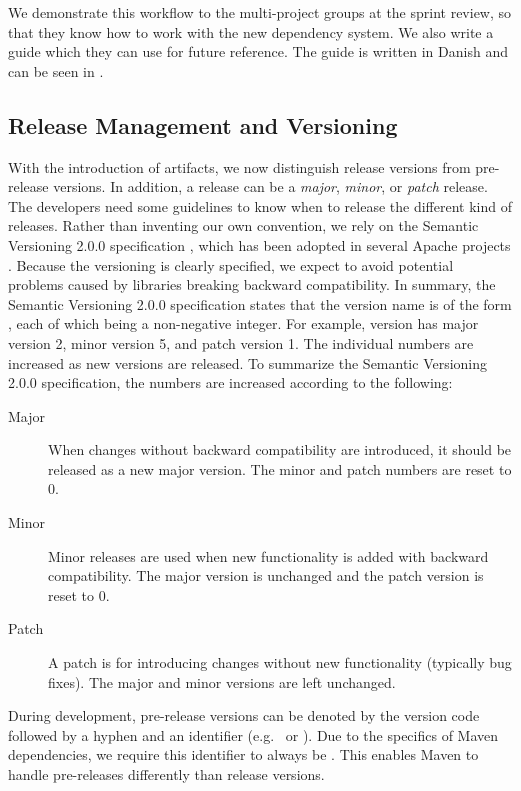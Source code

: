 We demonstrate this workflow to the multi-project groups at the sprint review, so that they know how to work with the new dependency system. We also write a guide which they can use for future reference. The guide is written in Danish and can be seen in .

\subsection{Release Management and Versioning}\label{subsec:release-management}
With the introduction of artifacts, we now distinguish release versions from pre-release versions. In addition, a release can be a \emph{major}, \emph{minor}, or \emph{patch} release. The developers need some guidelines to know when to release the different kind of releases. Rather than inventing our own convention, we rely on the Semantic Versioning 2.0.0 specification \parencite{semver2015}, which has been adopted in several Apache projects \parencite{apacheapr,apacheisis,apacheaccumulo}. Because the versioning is clearly specified, we expect to avoid potential problems caused by libraries breaking backward compatibility. In summary, the Semantic Versioning 2.0.0 specification states that the version name is of the form , each of which being a non-negative integer. For example, version  has major version 2, minor version 5, and patch version 1. The individual numbers are increased as new versions are released. To summarize the Semantic Versioning 2.0.0 specification, the numbers are increased according to the following:
\begin{description}
  \item[Major] When changes without backward compatibility are introduced, it should be released as a new major version. The minor and patch numbers are reset to 0.
  \item[Minor] Minor releases are used when new functionality is added with backward compatibility. The major version is unchanged and the patch version is reset to 0.
  \item[Patch] A patch is for introducing changes without new functionality (typically bug fixes). The major and minor versions are left unchanged.
\end{description}

During development, pre-release versions can be denoted by the version code followed by a hyphen and an identifier (e.g.\  or ). Due to the specifics of Maven dependencies, we require this identifier to always be . This enables Maven to handle pre-releases differently than release versions.


